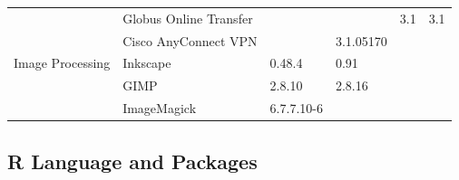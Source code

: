 \begin{table}[!ht]
{\begin{tabular}{|ll|l|l|l|l|}
\rowcolor{black!5}
\cellcolor{white}                                                      & \multicolumn{1}{|l|}{Globus Online Transfer} &                                                                     &                                                                   & 3.1                                                                    & 3.1                                            \\
\rowcolor{black!10}
\cellcolor{white}                                                      & \multicolumn{1}{|l|}{Cisco AnyConnect VPN}   &                                                                     & 3.1.05170                                                         &                                                                        &                                                \\
\hline
\rowcolor{black!5}
\cellcolor{white} Image Processing                                     & \multicolumn{1}{|l|}{Inkscape}               & 0.48.4                                                              & 0.91                                                              &                                                                        &                                                \\
\rowcolor{black!10}
\cellcolor{white}                                                      & \multicolumn{1}{|l|}{GIMP}                   & 2.8.10                                                              & 2.8.16                                                            &                                                                        &                                                \\
\rowcolor{black!5}
\cellcolor{white}                                                      & \multicolumn{1}{|l|}{ImageMagick}            & 6.7.7.10-6                                                          &                                                                   &                                                                        &                                                \\
\hline                                
\end{tabular}
}
\end{table}


\FloatBarrier

\subsection{R Language and Packages}


